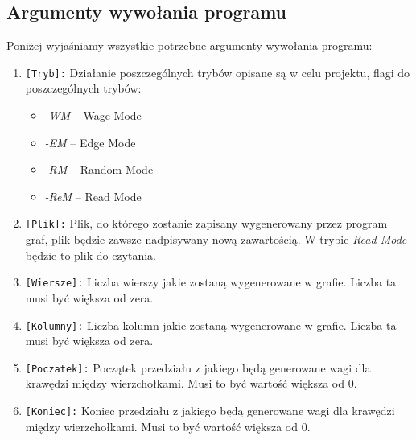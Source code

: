 \documentclass[10pt, a4paper]{report}
\begin{document}
\subsection{Argumenty wywołania programu}
Poniżej wyjaśniamy wszystkie potrzebne argumenty wywołania programu:
\begin{enumerate}
    \item \texttt{[Tryb]:}
    \newline Działanie poszczególnych trybów opisane są w celu projektu, flagi do poszczególnych trybów:
    \begin{itemize}
        \item \textit{-WM} -- Wage Mode
        \item \textit{-EM} -- Edge Mode
        \item \textit{-RM} -- Random Mode
        \item \textit{-ReM} -- Read Mode
    \end{itemize}

    \item \texttt{[Plik]:}
    \newline Plik, do którego zostanie zapisany wygenerowany przez program graf, 
    plik będzie zawsze nadpisywany nową zawartością. W trybie \textit{Read Mode} będzie to plik do czytania.

    \item \texttt{[Wiersze]:}
    \newline Liczba wierszy jakie zostaną wygenerowane w grafie. Liczba ta musi być większa od zera.

    \item \texttt{[Kolumny]:}
    \newline Liczba kolumn jakie zostaną wygenerowane w grafie. Liczba ta musi być większa od zera.

    \item \texttt{[Poczatek]:}
    \newline Początek przedziału z jakiego będą generowane wagi dla krawędzi między wierzchołkami. Musi to być wartość większa od 0.

    \item \texttt{[Koniec]:}
    \newline Koniec przedziału z jakiego będą generowane wagi dla krawędzi między wierzchołkami. Musi to być wartość większa od 0.


\end{enumerate}
\end{document}
